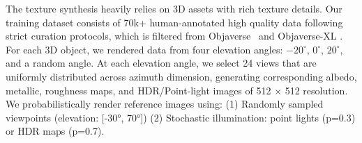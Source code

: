
The texture synthesis heavily relies on 3D assets with rich texture details. Our training dataset consists of 70k+ human-annotated high quality data following strict curation protocols, which is filtered from Objaverse~\cite{deitke2023objaverse} and Objaverse-XL \cite{deitke2023objaversexl}. For each 3D object, we rendered data from four elevation angles: $-20^{\circ}$, $0^{\circ}$, $20^{\circ}$, and a random angle. At each elevation angle, we select 24 views that are uniformly distributed across azimuth dimension, generating corresponding albedo, metallic, roughness maps, and HDR/Point-light images of 512 $\times$ 512 resolution. We probabilistically render reference images using:
(1) Randomly sampled viewpoints (elevation: [-30°, 70°])
(2) Stochastic illumination: point lights (p=0.3) or HDR maps (p=0.7).
